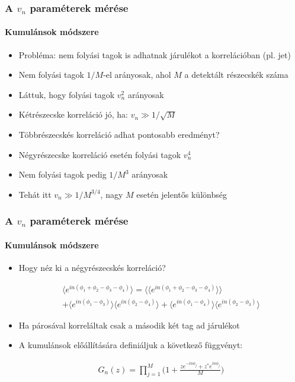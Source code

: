 \documentclass{beamer}
\begin{document}
\begin{frame}
\frametitle{A $v_n$ paraméterek mérése}
\framesubtitle{Kumulánsok módszere}
\begin{itemize}
\item Probléma: nem folyási tagok is adhatnak járulékot a korrelációban (pl. jet)
\item Nem folyási tagok $1/M$-el arányosak, ahol $M$ a detektált részecskék száma
\item Láttuk, hogy folyási tagok $v_n^2$ arányosak
\item Kétrészecske korreláció jó, ha: $v_n\gg 1/\sqrt{M}$
\item Többrészecskés korreláció adhat pontosabb eredményt?
\item Négyrészecske korreláció esetén folyási tagok $v_n^4$
\item Nem folyási tagok pedig $1/M^3$ arányosak
\item Tehát itt $v_n\gg 1/M^{3/4}$, nagy $M$ esetén jelentős különbség
\end{itemize}
\end{frame}

\begin{frame}
\frametitle{A $v_n$ paraméterek mérése}
\framesubtitle{Kumulánsok módszere}
\begin{itemize}
\item Hogy néz ki a négyrészecskés korreláció?
\begin{center}
\begin{align*}
\langle e^{in(\phi_1+\phi_2-\phi_3-\phi_4)}\rangle=\langle\langle e^{in(\phi_1+\phi_2-\phi_3-\phi_4)}\rangle\rangle\\+\langle e^{in(\phi_1-\phi_3)}\rangle\langle e^{in(\phi_2-\phi_4)}\rangle+\langle e^{in(\phi_1-\phi_4)}\rangle\langle e^{in(\phi_2-\phi_3)}\rangle
\end{align*}
\end{center}
\item Ha párosával korreláltak csak a második két tag ad járulékot
\item A kumulánsok előállítására definiáljuk a következő függvényt:
\begin{center}
\begin{align*}
G_n(z)=\prod_{j=1}^{M}\Bigg(1+\frac{ze^{-in\phi_j}+z^*e^{in\phi_j}}{M}\Bigg)
\end{align*}
\end{center}
\end{itemize}
\end{frame}
\end{document}
